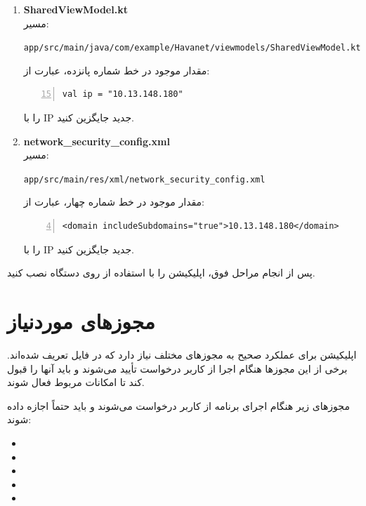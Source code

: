 \documentclass{report}
\begin{document}
\begin{enumerate}
	\item \textbf{SharedViewModel.kt}\\
	مسیر: \\
	\begin{latin}
		\texttt{app/src/main/java/com/example/Havanet/viewmodels/SharedViewModel.kt}\\
	\end{latin}
	مقدار موجود در خط شماره پانزده، عبارت از:
\begin{latin}
\begin{lstlisting}[mathescape=true, numbers=left, firstnumber=15]
val ip = "10.13.148.180"
\end{lstlisting}
\end{latin}
	را با IP جدید جایگزین کنید.
	
\item \textbf{network\_security\_config.xml}\\
	مسیر: \\
\begin{latin}
\texttt{app/src/main/res/xml/network\_security\_config.xml}\\
\end{latin}
	مقدار موجود در خط شماره چهار، عبارت از:
\begin{latin}
\begin{lstlisting}[mathescape=true, numbers=left, firstnumber=4]
<domain includeSubdomains="true">10.13.148.180</domain>
		\end{lstlisting}
	\end{latin}
	را با IP جدید جایگزین کنید.
\end{enumerate}

\vspace{0.5cm}

پس از انجام مراحل فوق، اپلیکیشن را با استفاده از  روی دستگاه نصب کنید.

\section{مجوزهای موردنیاز}

اپلیکیشن برای عملکرد صحیح به مجوزهای مختلف نیاز دارد که در فایل  تعریف شده‌اند. برخی از این مجوزها هنگام اجرا از کاربر درخواست تأیید می‌شوند و باید آنها را قبول کند تا امکانات مربوط فعال شوند.

مجوزهای زیر هنگام اجرای برنامه از کاربر درخواست می‌شوند و باید حتماً اجازه داده شوند:

\begin{itemize}
	\item {}
	\item {}
	\item {}
	\item {}
	\item {}
\end{itemize}
\end{document}
